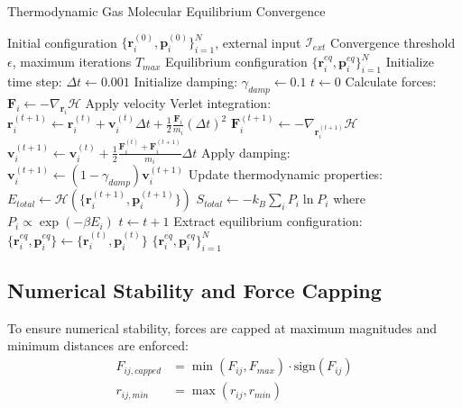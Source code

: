 \documentclass[11pt,a4paper]{article}
\begin{document}
\begin{algorithm}
\caption{Thermodynamic Gas Molecular Equilibrium Convergence}
\label{alg:equilibrium-seeking}
\begin{algorithmic}[1]
\REQUIRE Initial configuration $\{\mathbf{r}_i^{(0)}, \mathbf{p}_i^{(0)}\}_{i=1}^N$, external input $\mathcal{I}_{ext}$
\REQUIRE Convergence threshold $\epsilon$, maximum iterations $T_{max}$
\ENSURE Equilibrium configuration $\{\mathbf{r}_i^{eq}, \mathbf{p}_i^{eq}\}_{i=1}^N$
\STATE Initialize time step: $\Delta t \leftarrow 0.001$
\STATE Initialize damping: $\gamma_{damp} \leftarrow 0.1$
\STATE $t \leftarrow 0$
        \STATE Calculate forces: $\mathbf{F}_i \leftarrow -\nabla_{\mathbf{r}_i} \mathcal{H}$
        \STATE Apply velocity Verlet integration:
        \STATE $\mathbf{r}_i^{(t+1)} \leftarrow \mathbf{r}_i^{(t)} + \mathbf{v}_i^{(t)} \Delta t + \frac{1}{2} \frac{\mathbf{F}_i}{m_i} (\Delta t)^2$
        \STATE $\mathbf{F}_i^{(t+1)} \leftarrow -\nabla_{\mathbf{r}_i^{(t+1)}} \mathcal{H}$
        \STATE $\mathbf{v}_i^{(t+1)} \leftarrow \mathbf{v}_i^{(t)} + \frac{1}{2} \frac{\mathbf{F}_i^{(t)} + \mathbf{F}_i^{(t+1)}}{m_i} \Delta t$
        \STATE Apply damping: $\mathbf{v}_i^{(t+1)} \leftarrow (1 - \gamma_{damp}) \mathbf{v}_i^{(t+1)}$
    \ENDFOR
    \STATE Update thermodynamic properties:
    \STATE $E_{total} \leftarrow \mathcal{H}(\{\mathbf{r}_i^{(t+1)}, \mathbf{p}_i^{(t+1)}\})$
    \STATE $S_{total} \leftarrow -k_B \sum_i P_i \ln P_i$ where $P_i \propto \exp(-\beta E_i)$
    \STATE $t \leftarrow t + 1$
\ENDWHILE
\STATE Extract equilibrium configuration: $\{\mathbf{r}_i^{eq}, \mathbf{p}_i^{eq}\} \leftarrow \{\mathbf{r}_i^{(t)}, \mathbf{p}_i^{(t)}\}$
\RETURN $\{\mathbf{r}_i^{eq}, \mathbf{p}_i^{eq}\}_{i=1}^N$
\end{algorithmic}
\end{algorithm}

\subsection{Numerical Stability and Force Capping}

To ensure numerical stability, forces are capped at maximum magnitudes and minimum distances are enforced:
\begin{align}
F_{ij,capped} &= \min(F_{ij}, F_{max}) \cdot \text{sign}(F_{ij}) \label{eq:force-capping} \\
r_{ij,min} &= \max(r_{ij}, r_{min}) \label{eq:minimum-distance}
\end{align}
\end{document}
